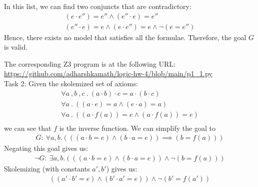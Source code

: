 \documentclass[12pt,letterpaper, onecolumn]{exam}
\newcommand{\link}[1]{{\color{blue}\href{#1}{#1}}}
\begin{document}
\begin{questions}
	In this list,
	we can find two conjuncts that are contradictory:
	\begin{align*}
		(e \cdot e'') = e'' \land (e'' \cdot e) = e'' \\
		(e'' \cdot e) = e \land (e \cdot e'') = e \land \neg (e = e'')
	\end{align*}
	Hence, there exists no model that satisfies all the formulae.
	Therefore, the goal $G$ is valid.

	The corresponding Z3 program is at the following URL:
	\link{https://github.com/adharshkamath/logic-hw-4/blob/main/p1\_1.py} \\
	

	Task 2:
	Given the skolemized set of axioms:
	\begin{align*}
		\forall a \:, b \:, c \:.\: (a \cdot b) \cdot c = a \cdot (b \cdot c) \\
		\forall a \:.\: ((a \cdot e) = a \land (e \cdot a) = a) \\
		\forall a \:.\: ((a \cdot f(a)) = e \land (a \cdot f(a)) = e) \\
	\end{align*}
	we can see that $f$ is the inverse function. We can simplify the goal to 
	\begin{align*}
		G : \: \forall a, b . (((a \cdot b = e) \land (b \cdot a = e)) \implies (b = f(a)) )
	\end{align*}
	Negating this goal gives us:
	\begin{align*}
		\neg G : \: \exists a, b . (((a \cdot b = e) \land (b \cdot a = e)) \land \neg(b = f(a)))
	\end{align*}
	Skolemizing (with constants $a', b'$) gives us:
	\begin{align*}
		((a' \cdot b' = e) \land (b' \cdot a' = e)) \land \neg(b' = f(a'))
	\end{align*}


\end{questions}
\end{document}
